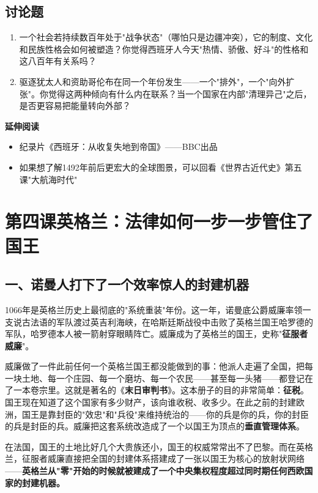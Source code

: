 \documentclass[a4paper,12pt]{ctexart}
\begin{document}
\subsection*{讨论题}
\begin{enumerate}
  \item 一个社会若持续数百年处于"战争状态"（哪怕只是边疆冲突），它的制度、文化和民族性格会如何被塑造？你觉得西班牙人今天"热情、骄傲、好斗"的性格和这八百年有关系吗？
  \item 驱逐犹太人和资助哥伦布在同一个年份发生——一个"排外"，一个"向外扩张"。你觉得这两种倾向有什么内在联系？当一个国家在内部"清理异己"之后，是否更容易把能量转向外部？
\end{enumerate}

\vspace{0.3cm}
\textcolor{blue!70!black}{\textbf{延伸阅读}}
\begin{itemize}
  \item 纪录片《西班牙：从收复失地到帝国》——BBC出品
  \item 如果想了解1492年前后更宏大的全球图景，可以回看《世界古近代史》第五课"大航海时代"
\end{itemize}

\newpage

\section{\textcolor{orange!80!black}{第四课\quad 英格兰：法律如何一步一步管住了国王}}

\subsection*{一、诺曼人打下了一个效率惊人的封建机器}

1066年是英格兰历史上最彻底的"系统重装"年份。这一年，诺曼底公爵威廉率领一支说古法语的军队渡过英吉利海峡，在哈斯廷斯战役中击败了英格兰国王哈罗德的军队，哈罗德本人被一箭射穿眼睛阵亡。威廉成为了英格兰的国王，史称"\textbf{征服者威廉}"。

威廉做了一件此前任何一个英格兰国王都没能做到的事：他派人走遍了全国，把每一块土地、每一个庄园、每一个磨坊、每一个农民——甚至每一头猪——都登记在了一本卷宗里。这就是著名的《\textbf{末日审判书}》。这本册子的目的非常简单：\textbf{征税}。国王现在知道了这个国家有多少财产，该向谁收税、收多少。在此之前的封建欧洲，国王是靠封臣的"效忠"和"兵役"来维持统治的——你的兵是你的兵，你的封臣的兵是封臣的兵。威廉把这套系统改造成了一个以国王为顶点的\textbf{垂直管理体系}。

在法国，国王的土地比好几个大贵族还小，国王的权威常常出不了巴黎。而在英格兰，征服者威廉直接把全国的封建体系搭建成了一张以国王为核心的放射状网络——\textbf{英格兰从"零"开始的时候就被建成了一个中央集权程度超过同时期任何西欧国家的封建机器。}
\end{document}
